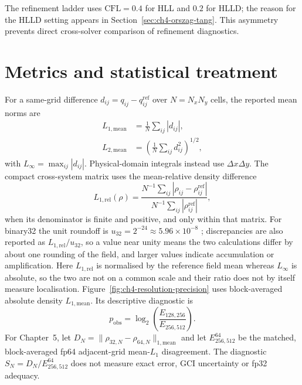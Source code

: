 The refinement ladder uses $\mathrm{CFL}=0.4$ for HLL and $0.2$ for HLLD; the
reason for the HLLD setting appears in Section~\ref{sec:ch4-orszag-tang}. This
asymmetry prevents direct cross-solver comparison of refinement diagnostics.

\section{Metrics and statistical treatment}
\label{sec:ch3-metrics}

For a same-grid difference $d_{ij}=q_{ij}-q^{\mathrm{ref}}_{ij}$ over
$N=N_xN_y$ cells, the reported mean norms are
\begin{equation}
 \begin{aligned}
 L_{1,\mathrm{mean}}&=\frac{1}{N}\sum_{ij}|d_{ij}|,\\
 L_{2,\mathrm{mean}}&=\left(\frac{1}{N}\sum_{ij}d_{ij}^{2}\right)^{1/2},
 \end{aligned}
 \label{eq:ch3-mean-norms}
\end{equation}
with $L_\infty=\max_{ij}|d_{ij}|$. Physical-domain integrals instead use
$\Delta x\Delta y$. The compact cross-system matrix uses the mean-relative
density difference
\begin{equation}
 L_{1,\mathrm{rel}}(\rho)=
 \frac{N^{-1}\sum_{ij}|\rho_{ij}-\rho^{\mathrm{ref}}_{ij}|}
      {N^{-1}\sum_{ij}|\rho^{\mathrm{ref}}_{ij}|},
 \label{eq:ch3-mean-relative}
\end{equation}
when its denominator is finite and positive, and only within that matrix.
For binary32 the unit roundoff is
$u_{32}=2^{-24}\approx5.96\times10^{-8}$ \citep{ieee7542019}; discrepancies are
also reported as $L_{1,\mathrm{rel}}/u_{32}$, so a value near unity means the
two calculations differ by about one rounding of the field, and larger values
indicate accumulation or amplification. Here $L_{1,\mathrm{rel}}$ is
normalised by the reference field mean whereas $L_\infty$ is absolute, so the
two are not on a common scale and their ratio does not by itself measure
localisation.
Figure~\ref{fig:ch4-resolution-precision} uses block-averaged absolute density
$L_{1,\mathrm{mean}}$. Its descriptive diagnostic is
\begin{equation}
 p_{\mathrm{obs}}=\log_2\!\left(\frac{E_{128,256}}{E_{256,512}}\right).
 \label{eq:ch3-observed-p}
\end{equation}
For Chapter~5, let $D_N=\|\rho_{32,N}-\rho_{64,N}\|_{1,\mathrm{mean}}$ and let
$E^{64}_{256,512}$ be the matched, block-averaged fp64 adjacent-grid
mean-$L_1$ disagreement. The diagnostic
$S_N=D_N/E^{64}_{256,512}$ does not measure exact error, GCI uncertainty or
fp32 adequacy.

